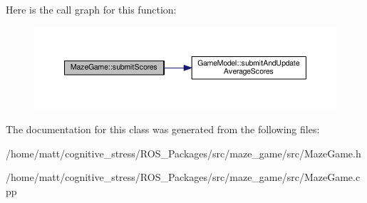 Here is the call graph for this function\-:\nopagebreak
\begin{figure}[H]
\begin{center}
\leavevmode
\includegraphics[width=350pt]{classMazeGame_a98aba2340bc3fc3893896cfd8d6f7710_cgraph}
\end{center}
\end{figure}




The documentation for this class was generated from the following files\-:\begin{DoxyCompactItemize}
\item 
/home/matt/cognitive\-\_\-stress/\-R\-O\-S\-\_\-\-Packages/src/maze\-\_\-game/src/Maze\-Game.\-h\item 
/home/matt/cognitive\-\_\-stress/\-R\-O\-S\-\_\-\-Packages/src/maze\-\_\-game/src/Maze\-Game.\-cpp\end{DoxyCompactItemize}
